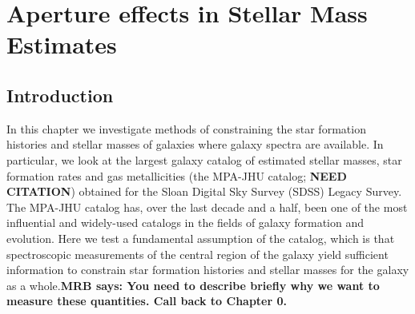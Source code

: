 \chapter{Aperture effects in Stellar Mass Estimates}

\label{ch:acm}
\newpage

\section{Introduction}

In this chapter we investigate methods of constraining the star formation histories and stellar masses of galaxies where galaxy spectra are available. In particular, we look at the largest galaxy catalog of estimated stellar masses, star formation rates and gas metallicities (the MPA-JHU catalog; {\bf NEED CITATION}) obtained for the Sloan Digital Sky Survey (SDSS) Legacy Survey. The MPA-JHU catalog has, over the last decade and a half, been one of the most influential and widely-used catalogs in the fields of galaxy formation and evolution. Here we test a fundamental assumption of the catalog, which is that spectroscopic measurements of the central region of the galaxy yield sufficient information to constrain star formation histories and stellar masses for the galaxy as a whole.\textbf{MRB says: You need to describe briefly why we want to measure
these quantities. Call back to Chapter 0. }\\

